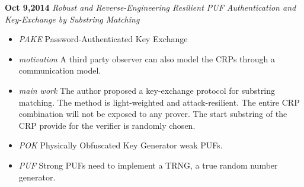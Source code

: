 \documentclass[]{article}
\begin{document}
\noindent \textbf{Oct 9,2014}
\textit{Robust and Reverse-Engineering Resilient PUF Authentication and Key-Exchange by Substring Matching}
\indent		\begin{itemize}

                \item \textit{PAKE} Password-Authenticated Key Exchange

                \item \textit{motivation} A third party observer can also model the CRPs through a 
                communication model.

                \item \textit{main work} The author proposed a key-exchange protocol for substring matching. 
                The method is light-weighted and attack-resilient. The entire CRP combination will not be
                exposed to any prover. The start substring of the CRP provide for the verifier is randomly 
                chosen.

                \item \textit{POK} Physically Obfuscated Key Generator weak PUFs.

                \item \textit{PUF}  Strong PUFs need to implement a TRNG, a true random number generator.

            \end{itemize}
\end{document}

